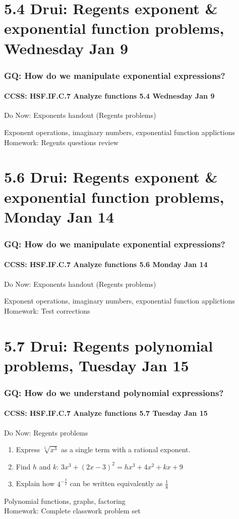 \documentclass{beamer}
\begin{document}
  \section{5.4 Drui: Regents exponent \& exponential function problems, Wednesday Jan 9}
    \frame
    {
      \frametitle{GQ: How do we manipulate exponential expressions?}
      \framesubtitle{CCSS: HSF.IF.C.7 Analyze functions    \alert{5.4 Wednesday Jan 9}}

      \begin{block}{Do Now: Exponents handout (Regents problems)}
      \end{block}
      Exponent operations, imaginary numbers, exponential function applictions \\ \bigskip
      Homework: Regents questions review
    }

  \section{5.6 Drui: Regents exponent \& exponential function problems, Monday Jan 14}
    \frame
    {
      \frametitle{GQ: How do we manipulate exponential expressions?}
      \framesubtitle{CCSS: HSF.IF.C.7 Analyze functions    \alert{5.6 Monday Jan 14}}

      \begin{block}{Do Now: Exponents handout (Regents problems)}
      \end{block}
      Exponent operations, imaginary numbers, exponential function applictions \\ \bigskip
      Homework: Test corrections
    }

  \section{5.7 Drui: Regents polynomial problems, Tuesday Jan 15}
    \frame
    {
      \frametitle{GQ: How do we understand polynomial expressions?}
      \framesubtitle{CCSS: HSF.IF.C.7 Analyze functions    \alert{5.7 Tuesday Jan 15}}

      \begin{block}{Do Now: Regents problems}
        \begin{enumerate}
          \item Express $\sqrt[5]{x^3}$ as a single term with a rational exponent.
          \item Find $h$ and $k$: $3x^3+(2x-3)^2=hx^3+4x^2+kx+9$
          \item Explain how $\displaystyle 4^{-\frac{3}{2}}$ can be written equivalently as $\frac{1}{8}$
        \end{enumerate}
      \end{block}
      Polynomial functions, graphs, factoring\\ \bigskip
      Homework: Complete classwork problem set
    }
\end{document}
